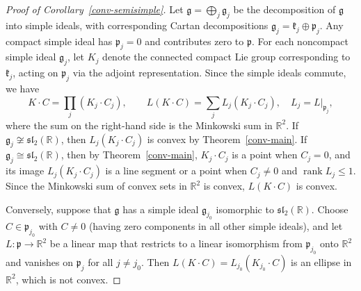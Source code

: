 \documentclass[11pt,reqno]{amsart}
\theoremstyle{remark}
\newcommand{\R}{\mathbb R}
\newcommand{\gfr}{\mathfrak g}
\newcommand{\kfr}{\mathfrak k}
\newcommand{\pfr}{\mathfrak p}
\begin{document}
\begin{proof}[Proof of Corollary~\ref{conv-semisimple}]
Let $\gfr=\bigoplus_j\gfr_j$ be the decomposition of $\gfr$ into simple
ideals, with corresponding Cartan decompositions
$\gfr_j=\kfr_j\oplus\pfr_j$. Any compact simple ideal has $\pfr_j=0$ and
contributes zero to $\pfr$. For each noncompact simple ideal $\gfr_j$,
let $K_j$ denote the connected compact Lie group corresponding to
$\kfr_j$, acting on $\pfr_j$ via the adjoint representation. Since the
simple ideals commute, we have
\[
 K\cdot C=\prod_j(K_j\cdot C_j),\qquad
 L(K\cdot C)=\sum_j L_j(K_j\cdot C_j),
 \quad L_j=L|_{\pfr_j},
\]
where the sum on the right-hand side is the Minkowski sum in $\R^2$. If
$\gfr_j\not\cong\mathfrak{sl}_2(\R)$, then $L_j(K_j\cdot C_j)$ is convex
by Theorem~\ref{conv-main}. If $\gfr_j\cong\mathfrak{sl}_2(\R)$, then by
Theorem~\ref{conv-main}, $K_j\cdot C_j$ is a point when $C_j=0$, and its
image $L_j(K_j\cdot C_j)$ is a line segment or a point when $C_j\ne0$
and $\operatorname{rank}L_j\le1$. Since the Minkowski sum of convex sets
in $\R^2$ is convex, $L(K\cdot C)$ is convex.

Conversely, suppose that $\gfr$ has a simple ideal $\gfr_{j_0}$
isomorphic to $\mathfrak{sl}_2(\R)$. Choose $C\in\pfr_{j_0}$ with
$C\ne0$ (having zero components in all other simple ideals), and let
$L:\pfr\to\R^2$ be a linear map that restricts to a linear isomorphism
from $\pfr_{j_0}$ onto $\R^2$ and vanishes on $\pfr_j$ for all
$j\ne j_0$. Then $L(K\cdot C)=L_{j_0}(K_{j_0}\cdot C)$ is an ellipse in $\R^2$, which is not convex.
\end{proof}
\end{document}
